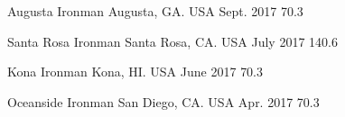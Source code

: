 \vspace{-4mm}


\vspace{-2mm}
\begin{ironmans}
  \cvhonor
    {Augusta Ironman} %
    {Augusta, GA. USA} %
    {Sept. 2017} %
    {70.3} %
    
  \cvhonor
    {Santa Rosa Ironman} %
    {Santa Rosa, CA. USA} %
    {July 2017} %
    {140.6} %

  \cvhonor
    {Kona Ironman} %
    {Kona, HI. USA} %
    {June 2017} %
    {70.3} %

  \cvhonor
    {Oceanside Ironman} %
    {San Diego, CA. USA} %
    {Apr. 2017} %
    {70.3} %





\end{ironmans}

